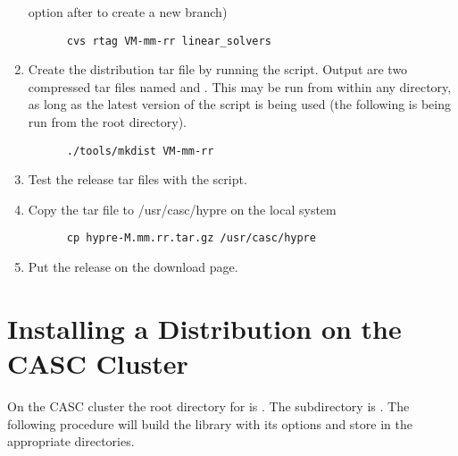 \begin{enumerate}
 option after  to create a new branch)
\begin{verbatim}
      cvs rtag VM-mm-rr linear_solvers
\end{verbatim}
\item Create the distribution tar file by running the 
script.  Output are two compressed tar files named 
and .  This may be run from within any
directory, as long as the latest version of the script is being used (the
following is being run from the root directory).
\begin{verbatim}
      ./tools/mkdist VM-mm-rr
\end{verbatim}
\item Test the release tar files with the  script.
\item Copy the tar file to /usr/casc/hypre on the local system
\begin{verbatim}
      cp hypre-M.mm.rr.tar.gz /usr/casc/hypre
\end{verbatim}
\item Put the release on the download page.
\end{enumerate}

\section{Installing a Distribution on the CASC Cluster}
\label{Installing a Distribution on the CASC Cluster}

On the CASC cluster the root directory for \hypre{} is .  The 
subdirectory is . The following procedure will build the 
library with its options and store in the appropriate directories.

